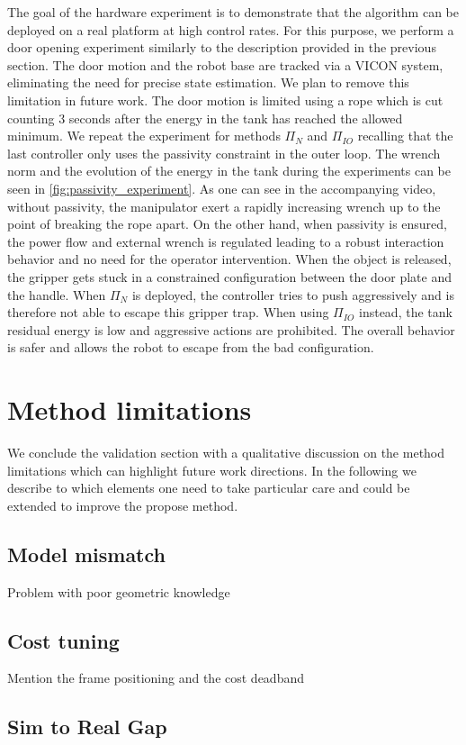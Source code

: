 The goal of the hardware experiment is to demonstrate that the algorithm can be deployed on a real platform at high control rates. For this purpose, we perform a door opening experiment similarly to the description provided in the previous section. The door motion and the robot base are tracked via a VICON system, eliminating the need for precise state estimation. We plan to remove this limitation in future work. The door motion is limited using a rope which is cut counting 3 seconds after the energy in the tank has reached the allowed minimum. We repeat the experiment for methods $\Pi_{N}$ and $\Pi_{IO}$ recalling that the last controller only uses the passivity constraint in the outer loop. The wrench norm and the evolution of the energy in the tank during the experiments can be seen in \fig \ref{fig:passivity_experiment}. As one can see in the accompanying video, without passivity, the manipulator exert a rapidly increasing wrench up to the point of breaking the rope apart. On the other hand, when passivity is ensured, the power flow and external wrench is regulated leading to a robust interaction behavior and no need for the operator intervention. When the object is released, the gripper gets stuck in a constrained configuration between the door plate and the handle. When $\Pi_{N}$ is deployed, the controller tries to push aggressively and is therefore not able to escape this gripper trap. When using $\Pi_{IO}$ instead, the tank residual energy is low and aggressive actions are prohibited. The overall behavior is safer and allows the robot to escape from the bad configuration.  


\section{Method limitations}
We conclude the validation section with a qualitative discussion on the method limitations which can highlight future work directions. In the following we describe to which elements one need to take particular care and could be extended to improve the propose method.

\subsection{Model mismatch}
Problem with poor geometric knowledge

\subsection{Cost tuning}
Mention the frame positioning and the cost deadband

\subsection{Sim to Real Gap}

